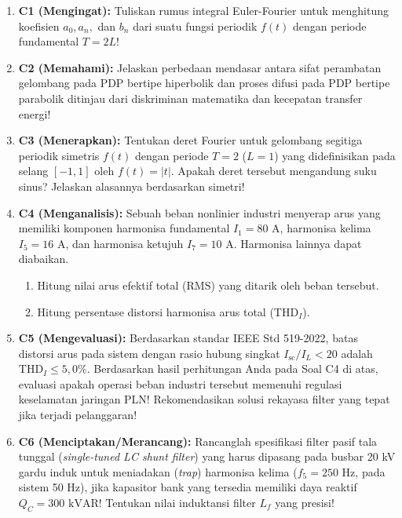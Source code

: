 \documentclass[11pt,a4paper]{article}
\theoremstyle{definition}
\begin{document}
\begin{enumerate}[leftmargin=*]
    \item \textbf{C1 (Mengingat):} 
    Tuliskan rumus integral Euler-Fourier untuk menghitung koefisien $a_0, a_n,$ dan $b_n$ dari suatu fungsi periodik $f(t)$ dengan periode fundamental $T = 2L$!
    
    \item \textbf{C2 (Memahami):} 
    Jelaskan perbedaan mendasar antara sifat perambatan gelombang pada PDP bertipe hiperbolik dan proses difusi pada PDP bertipe parabolik ditinjau dari diskriminan matematika dan kecepatan transfer energi!
    
    \item \textbf{C3 (Menerapkan):} 
    Tentukan deret Fourier untuk gelombang segitiga periodik simetris $f(t)$ dengan periode $T = 2$ ($L = 1$) yang didefinisikan pada selang $[-1, 1]$ oleh $f(t) = |t|$. Apakah deret tersebut mengandung suku sinus? Jelaskan alasannya berdasarkan simetri!
    
    \item \textbf{C4 (Menganalisis):} 
    Sebuah beban nonlinier industri menyerap arus yang memiliki komponen harmonisa fundamental $I_1 = 80\text{ A}$, harmonisa kelima $I_5 = 16\text{ A}$, dan harmonisa ketujuh $I_7 = 10\text{ A}$. Harmonisa lainnya dapat diabaikan.
    \begin{enumerate}
        \item Hitung nilai arus efektif total ($\text{RMS}$) yang ditarik oleh beban tersebut.
        \item Hitung persentase distorsi harmonisa arus total ($\text{THD}_I$).
    \end{enumerate}
    
    \item \textbf{C5 (Mengevaluasi):} 
    Berdasarkan standar IEEE Std 519-2022, batas distorsi arus pada sistem dengan rasio hubung singkat $I_{\text{sc}}/I_L < 20$ adalah $\text{THD}_I \le 5{,}0\%$. Berdasarkan hasil perhitungan Anda pada Soal C4 di atas, evaluasi apakah operasi beban industri tersebut memenuhi regulasi keselamatan jaringan PLN! Rekomendasikan solusi rekayasa filter yang tepat jika terjadi pelanggaran!
    
    \item \textbf{C6 (Menciptakan/Merancang):} 
    Rancanglah spesifikasi filter pasif tala tunggal (\textit{single-tuned LC shunt filter}) yang harus dipasang pada busbar 20 kV gardu induk untuk meniadakan (\textit{trap}) harmonisa kelima ($f_5 = 250\text{ Hz}$, pada sistem 50 Hz), jika kapasitor bank yang tersedia memiliki daya reaktif $Q_C = 300\text{ kVAR}$! Tentukan nilai induktansi filter $L_f$ yang presisi!
\end{enumerate}
\end{document}
